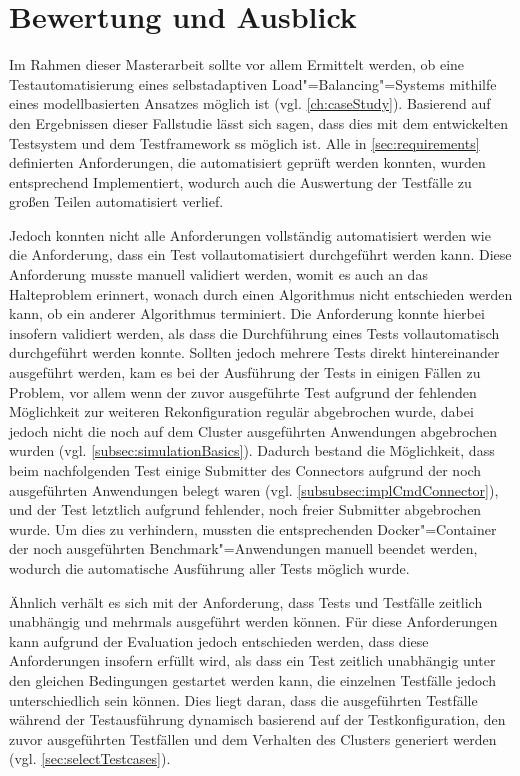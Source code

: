 \section{Bewertung und Ausblick}
\label{sec:outlook}

Im Rahmen dieser Masterarbeit sollte vor allem Ermittelt werden, ob eine Testautomatisierung eines selbstadaptiven Load"=Balancing"=Systems mithilfe eines modellbasierten Ansatzes möglich ist (vgl. \cref{ch:caseStudy}).
Basierend auf den Ergebnissen dieser Fallstudie lässt sich sagen, dass dies mit dem entwickelten Testsystem und dem Testframework \gls{ss} möglich ist.
Alle in \cref{sec:requirements} definierten Anforderungen, die automatisiert geprüft werden konnten, wurden entsprechend Implementiert, wodurch auch die Auswertung der Testfälle zu großen Teilen automatisiert verlief.

Jedoch konnten nicht alle Anforderungen vollständig automatisiert werden wie \zB die Anforderung, dass ein Test vollautomatisiert durchgeführt werden kann.
Diese Anforderung musste manuell validiert werden, womit es auch an das Halteproblem \cite{Turing1937,Turing1938} erinnert, wonach durch einen Algorithmus nicht entschieden werden kann, ob ein anderer Algorithmus terminiert.
Die Anforderung konnte hierbei insofern validiert werden, als dass die Durchführung eines Tests vollautomatisch durchgeführt werden konnte.
Sollten jedoch mehrere Tests direkt hintereinander ausgeführt werden, kam es bei der Ausführung der Tests in einigen Fällen zu Problem, vor allem wenn der zuvor ausgeführte Test aufgrund der fehlenden Möglichkeit zur weiteren Rekonfiguration regulär abgebrochen wurde, dabei jedoch nicht die noch auf dem Cluster ausgeführten Anwendungen abgebrochen wurden (vgl. \cref{subsec:simulationBasics}).
Dadurch bestand die Möglichkeit, dass beim nachfolgenden Test einige Submitter des Connectors aufgrund der noch ausgeführten Anwendungen belegt waren (vgl. \cref{subsubsec:implCmdConnector}), und der Test letztlich aufgrund fehlender, noch freier Submitter abgebrochen wurde.
Um dies zu verhindern, mussten die entsprechenden Docker"=Container der noch ausgeführten Benchmark"=Anwendungen manuell beendet werden, wodurch die automatische Ausführung aller Tests möglich wurde.

Ähnlich verhält es sich mit der Anforderung, dass Tests und Testfälle zeitlich unabhängig und mehrmals ausgeführt werden können.
Für diese Anforderungen kann aufgrund der Evaluation jedoch entschieden werden, dass diese Anforderungen insofern erfüllt wird, als dass ein Test zeitlich unabhängig unter den gleichen Bedingungen gestartet werden kann, die einzelnen Testfälle jedoch unterschiedlich sein können.
Dies liegt daran, dass die ausgeführten Testfälle während der Testausführung dynamisch basierend auf der Testkonfiguration, den zuvor ausgeführten Testfällen und dem Verhalten des Clusters generiert werden (vgl. \cref{sec:selectTestcases}).

